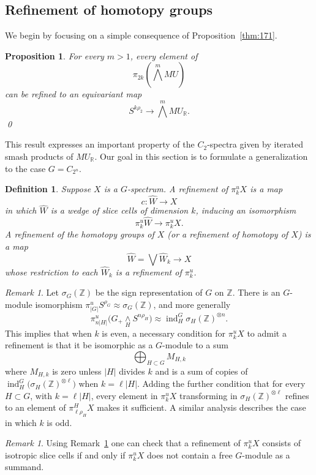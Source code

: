 \documentclass{amsart}
\newtheorem{prop}[equation]{Proposition}
\newtheorem{definition}[equation]{Definition}
\newenvironment{defin}{\begin{definition}\rm}{\end{definition}}
\newtheorem{rem}[equation]{Remark}
\theoremstyle{definition}
\newtheorem{defin}[equation]{Definition}
\theoremstyle{remark}
\newtheorem{rem}[equation]{Remark}
\newcommand{\Z}{{\mathbb Z}}
\newcommand{\R}{{\mathbb R}}
\newcommand{\mur}{MU_{\R}}
\newcommand{\piu}{\pi^{u}}
\DeclareMathOperator{\ind}{ind}
\newcommand{\zt}{C_{2}}
\newcommand{\ztn}{C_{2^{n}}}
\newcommand{\refine}{\widehat{W}}
\begin{document}
\subsection{Refinement of homotopy groups}
\label{sec:refinement-homotopy}

We begin by focusing on a simple consequence of Proposition~\ref{thm:171}.

\begin{prop}
\label{thm:80} For every $m>1$, every element of
\[
\pi_{2k}\left(\bigwedge^{m}MU\right)
\]
can be refined to an equivariant map
\[
S^{k\rho_{2}}\to  \bigwedge^{m}\mur.
\]
\qed
\end{prop}

This result expresses an important property of the $\zt$-spectra given
by iterated smash products of $\mur$.  Our goal in this section is to
formulate a generalization to the case $G=\ztn$.

\begin{defin}
\label{def:2} Suppose $X$ is a $G$-spectrum.  A {\em refinement of
$\piu_{k}X$} is a map
\[
c:\refine\to X
\]
in which $\refine$ is a wedge of slice cells of dimension $k$, 
inducing an isomorphism
\[
\piu_{k}\refine\to\piu_{k}X.
\]
A {\em refinement of the homotopy groups of $X$} (or a {\em refinement
of homotopy of $X$}) is a map
\[
\refine=\bigvee \refine_{k}\to X
\]
whose restriction to each $\refine_{k}$ is a refinement of $\piu_{k}$.
\end{defin}

\begin{rem}
\label{rem:22}   Let $\sigma_{G}(\Z)$ be the sign representation of
$G$ on $\Z$.    There is an $G$-module isomorphism
$\piu_{|G|}S^{\rho_{G}}\approx\sigma_{G}(\Z)$, and more generally
\[
\piu_{n|H|}\big(G_{+}\underset{H}{\wedge}S^{n\rho_{H}}\big) \approx
\ind_{H}^{G}\sigma_{H}(\Z)^{\otimes n}.
\]
This implies that when $k$ is even, a necessary condition for
$\piu_{k}X$ to admit a refinement is that it be isomorphic as a
$G$-module to a sum
\[
\bigoplus_{H\subset G }M_{H,k}
\]
where $M_{H,k}$ is zero unless $|H|$ divides $k$ and is a sum of
copies of $\ind_{H}^{G}\big(\sigma_{H}(\Z)^{\otimes \ell}\big)$ when
$k=\ell |H|$.  Adding the further condition that for every $H\subset
G$, with $k=\ell |H|$, every element in $\piu_{k}X$ transforming in
$\sigma_{H}(\Z)^{\otimes\ell}$ refines to an element of
$\pi^{H}_{\ell\rho_{H}}X$ makes it sufficient.  A similar analysis
describes the case in which $k$ is odd.
\end{rem}

\begin{rem}
\label{rem:28}
Using Remark~\ref{rem:22} one can check that a refinement of
$\piu_{k}X$ consists of isotropic slice cells if and only if
$\piu_{k}X$ does not contain a free $G$-module as a summand.   
\end{rem}
\end{document}
